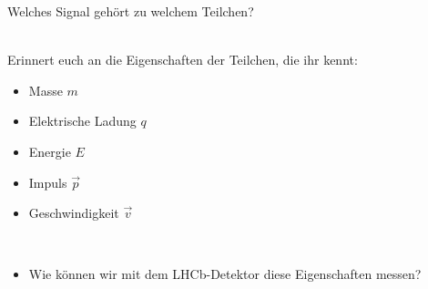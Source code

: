 
\begin{frame}{Welches Signal gehört zu welchem Teilchen?}
    

\ \\
Erinnert euch an die Eigenschaften der Teilchen, die ihr kennt: \\
\begin{itemize}
    \item<2-> Masse \hfill $m$ \hspace{6cm}\,
    \item<2-> Elektrische Ladung  \hfill $q$ \hspace{6cm}\,
    \item<2-> Energie  \hfill $E$ \hspace{6cm}\,
    \item<2-> Impuls  \hfill $\vec{p} $ \hspace{6cm}\,
    \item<2-> Geschwindigkeit  \hfill $\vec{v}$ \hspace{6cm}\,
 
\ \\
    \item<3->[\ding{220}] Wie können wir mit dem LHCb-Detektor diese Eigenschaften messen?

    
\end{itemize}
\end{frame}


